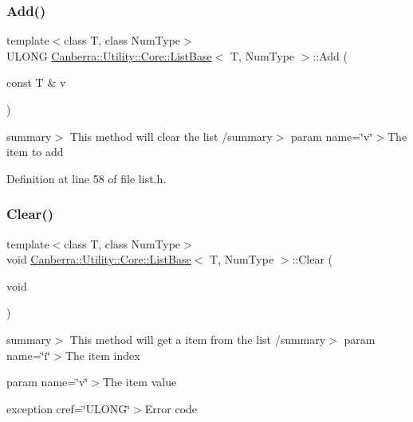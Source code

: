 \subsubsection{\texorpdfstring{Add()}{Add()}}
{\footnotesize\ttfamily template$<$class T, class Num\+Type$>$ \\
U\+L\+O\+NG \hyperlink{class_canberra_1_1_utility_1_1_core_1_1_list_base}{Canberra\+::\+Utility\+::\+Core\+::\+List\+Base}$<$ T, Num\+Type $>$\+::Add (\begin{DoxyParamCaption}\item[{const T \&}]{v }\end{DoxyParamCaption})\hspace{0.3cm}{\ttfamily [inline]}}

summary$>$ This method will clear the list /summary$>$ param name=\char`\"{}v\char`\"{}$>$The item to add

Definition at line 58 of file list.\+h.

\mbox{\label{class_canberra_1_1_utility_1_1_core_1_1_list_base_ab8431d144c5e017b9e06502549f26833_ab8431d144c5e017b9e06502549f26833}} 
\subsubsection{\texorpdfstring{Clear()}{Clear()}}
{\footnotesize\ttfamily template$<$class T, class Num\+Type$>$ \\
void \hyperlink{class_canberra_1_1_utility_1_1_core_1_1_list_base}{Canberra\+::\+Utility\+::\+Core\+::\+List\+Base}$<$ T, Num\+Type $>$\+::Clear (\begin{DoxyParamCaption}\item[{void}]{ }\end{DoxyParamCaption})\hspace{0.3cm}{\ttfamily [inline]}}

summary$>$ This method will get a item from the list /summary$>$ param name=\char`\"{}i\char`\"{}$>$The item index

param name=\char`\"{}v\char`\"{}$>$The item value

exception cref=\char`\"{}\+U\+L\+O\+N\+G\char`\"{}$>$Error code

